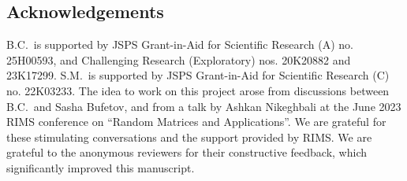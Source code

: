 \documentclass[pdftex]{sigma}
\numberwithin{equation}{section}
\theoremstyle{definition}
\begin{document}
\subsection*{Acknowledgements}

B.C.\ is supported by JSPS Grant-in-Aid for Scientific Research (A) no. 25H00593, and Challenging Research (Exploratory) nos. 20K20882 and 23K17299.
S.M.\ is supported by JSPS Grant-in-Aid for Scientific Research (C) no. 22K03233.
The idea to work on this project arose from discussions between B.C.\ and Sasha Bufetov, and from a talk by Ashkan Nikeghbali at the June 2023 RIMS conference on ``Random Matrices and Applications''.
We are grateful for these stimulating conversations and the support provided by RIMS.
We are grateful to the anonymous reviewers for their constructive feedback, which significantly improved this manuscript.
\end{document}
